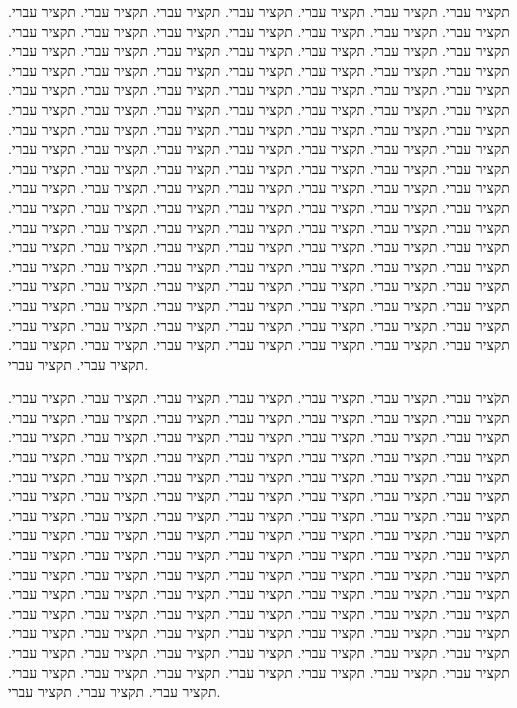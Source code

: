 תקציר עברי.  תקציר עברי.  תקציר עברי.  תקציר עברי.  תקציר עברי.  תקציר עברי.  תקציר עברי.  תקציר עברי.  תקציר עברי.  תקציר עברי.  תקציר עברי.  תקציר
עברי.  תקציר עברי.  תקציר עברי.  תקציר עברי.  תקציר עברי.  תקציר עברי.  תקציר עברי.  תקציר עברי.  תקציר עברי.  תקציר עברי.  תקציר עברי.  תקציר עברי.
תקציר עברי.  תקציר עברי.  תקציר עברי.  תקציר עברי.  תקציר עברי.  תקציר עברי.  תקציר עברי.  תקציר עברי.  תקציר עברי.  תקציר עברי.  תקציר עברי.  תקציר
עברי.  תקציר עברי.  תקציר עברי.  תקציר עברי.  תקציר עברי.  תקציר עברי.  תקציר עברי.  תקציר עברי.  תקציר עברי.  תקציר עברי.  תקציר עברי.  תקציר עברי.
תקציר עברי.  תקציר עברי.  תקציר עברי.  תקציר עברי.  תקציר עברי.  תקציר עברי.  תקציר עברי.  תקציר עברי.  תקציר עברי.  תקציר עברי.  תקציר עברי.  תקציר
עברי.  תקציר עברי.  תקציר עברי.  תקציר עברי.  תקציר עברי.  תקציר עברי.  תקציר עברי.  תקציר עברי.  תקציר עברי.  תקציר עברי.  תקציר עברי.  תקציר עברי.
תקציר עברי.  תקציר עברי.  תקציר עברי.  תקציר עברי.  תקציר עברי.  תקציר עברי.  תקציר עברי.  תקציר עברי.  תקציר עברי.  תקציר עברי.  תקציר עברי.  תקציר
עברי.  תקציר עברי.  תקציר עברי.  תקציר עברי.  תקציר עברי.  תקציר עברי.  תקציר עברי.  תקציר עברי.  תקציר עברי.  תקציר עברי.  תקציר עברי.  תקציר עברי.
תקציר עברי.  תקציר עברי.  תקציר עברי.  תקציר עברי.  תקציר עברי.  תקציר עברי.  תקציר עברי.  תקציר עברי.  תקציר עברי.  תקציר עברי.  תקציר עברי.  תקציר
עברי.  תקציר עברי.  תקציר עברי.  תקציר עברי.  תקציר עברי.  תקציר עברי.  תקציר עברי.  תקציר עברי.  תקציר עברי.  תקציר עברי.  תקציר עברי.  תקציר עברי.
תקציר עברי.  תקציר עברי.  תקציר עברי.  תקציר עברי.  תקציר עברי.  תקציר עברי.  תקציר עברי.  תקציר עברי.  תקציר עברי.  תקציר עברי.  תקציר עברי.  תקציר
עברי.  תקציר עברי.

תקֹציר עברי.  תקציר עברי.  תקציר עברי.  תקציר עברי.  תקציר עברי.  תקציר עברי.  תקציר עברי.  תקציר עברי.  תקציר עברי.  תקציר עברי.  תקציר עברי.  תקציר
עברי.  תקציר עברי.  תקציר עברי.  תקציר עברי.  תקציר עברי.  תקציר עברי.  תקציר עברי.  תקציר עברי.  תקציר עברי.  תקציר עברי.  תקציר עברי.  תקציר עברי.
תקציר עברי.  תקציר עברי.  תקציר עברי.  תקציר עברי.  תקציר עברי.  תקציר עברי.  תקציר עברי.  תקציר עברי.  תקציר עברי.  תקציר עברי.  תקציר עברי.  תקציר
עברי.  תקציר עברי.  תקציר עברי.  תקציר עברי.  תקציר עברי.  תקציר עברי.  תקציר עברי.  תקציר עברי.  תקציר עברי.  תקציר עברי.  תקציר עברי.  תקציר עברי.
תקציר עברי.  תקציר עברי.  תקציר עברי.  תקציר עברי.  תקציר עברי.  תקציר עברי.  תקציר עברי.  תקציר עברי.  תקציר עברי.  תקציר עברי.  תקציר עברי.  תקציר
עברי.  תקציר עברי.  תקציר עברי.  תקציר עברי.  תקציר עברי.  תקציר עברי.  תקציר עברי.  תקציר עברי.  תקציר עברי.  תקציר עברי.  תקציר עברי.  תקציר עברי.
תקציר עברי.  תקציר עברי.  תקציר עברי.  תקציר עברי.  תקציר עברי.  תקציר עברי.  תקציר עברי.  תקציר עברי.  תקציר עברי.  תקציר עברי.  תקציר עברי.  תקציר
עברי.  תקציר עברי.  תקציר עברי.  תקציר עברי.  תקציר עברי.  תקציר עברי.  תקציר עברי.  תקציר עברי.  תקציר עברי.  תקציר עברי.  תקציר עברי.  תקציר עברי.
תקציר עברי.  תקציר עברי.  תקציר עברי.  תקציר עברי.  תקציר עברי.  תקציר עברי.  תקציר עברי.  תקציר עברי.  תקציר עברי.  תקציר עברי.  תקציר עברי.  תקציר
עברי.  תקציר עברי.  תקציר עברי.  תקציר עברי.  תקציר עברי.

